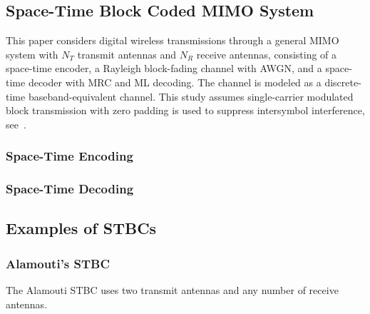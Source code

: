 \subsection{Space-Time Block Coded MIMO System}
This paper considers digital wireless transmissions through a general MIMO system with $N_T$ transmit antennas and $N_R$ receive antennas, consisting of a space-time encoder, a Rayleigh block-fading channel with AWGN, and a space-time decoder with MRC and ML decoding. The channel is modeled as a discrete-time baseband-equivalent channel. This study assumes single-carrier modulated block transmission with zero padding is used to suppress intersymbol interference, see~\cite{wang00,wang04}.

\subsubsection{Space-Time Encoding}

\subsubsection{Space-Time Decoding}

\subsection{Examples of STBCs}

\subsubsection{Alamouti's STBC}
The Alamouti STBC uses two transmit antennas and any number of receive antennas.
